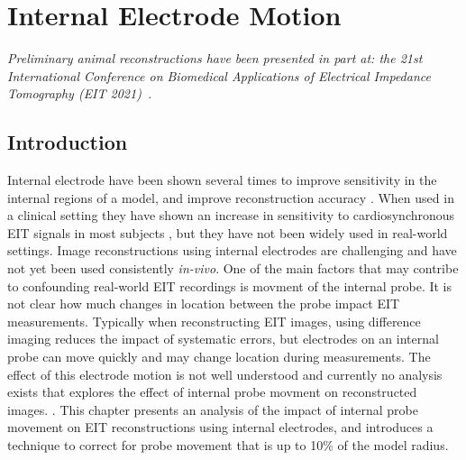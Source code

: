 \chapter{Internal Electrode Motion}
\label{chap:chapter-7}

\emph{Preliminary animal reconstructions have
 been presented in part at: 
 the 21st International Conference on Biomedical 
 Applications of Electrical Impedance Tomography (EIT 2021)~\parencite{stowe_using_2021}.} 

\section{Introduction}
Internal electrode have been shown several times to improve sensitivity in the internal regions 
of a model, and improve reconstruction accuracy
\parencite{nasehi_tehrani_modelling_2012,nasehi_tehrani_evaluation_2012,nguyen_electrical_2020,pilkington_utilization_1989,schuessler_utility_1995}.
When used in a clinical setting they have shown an increase in sensitivity to cardiosynchronous
EIT signals in most subjects \parencite{czaplik_application_2014}, but they have not been widely used 
in real-world settings. 
Image reconstructions using internal electrodes are challenging and have not yet 
been used consistently \emph{in-vivo}.
One of the main factors that may contribe to confounding real-world EIT recordings is movment 
of the internal probe. 
It is not clear how much changes in location between the probe impact EIT measurements.
Typically when reconstructing EIT images, using difference imaging reduces the impact of 
systematic errors, but electrodes on an internal probe can move quickly and may change location 
during measurements. 
The effect of this electrode motion is not well understood and currently no analysis exists 
that explores the effect of internal probe movment on reconstructed images. 
\parencite{nguyen_review_2012}. 
This chapter presents an analysis of the impact of internal probe movement on 
EIT reconstructions using internal electrodes, and introduces a technique to correct for probe 
movement that is up to 10\% of the model radius.

